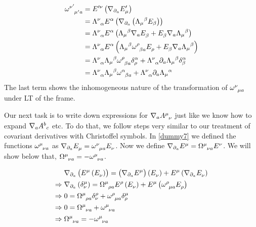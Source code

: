 \begin{align*}
    \tt{\omega}{\nu'}{\mu' a} &= \tt{E'}{ \nu}{} \lera{ \cov{ \tt{E'}{}{ \mu}}{ \partial_a}} \\
    &= \tt{ \Lambda}{ \nu}{ \alpha} \tt{E}{ \alpha}{} \lera{ \cov{ \lera{ \Lambda_ \mu{}^ \beta E_ \beta}}{ \partial_a}} \\
    &= \tt{ \Lambda}{ \nu}{ \alpha} \tt{E}{ \alpha}{} \lera{ \Lambda_ \mu{^ \beta } \cov{\tt{E}{}{\beta}}{a}+ \tt{E}{}{\beta} \cov{\du{\Lambda}{\mu}{\beta}}{a}}\\
     &= \tt{ \Lambda}{ \nu}{ \alpha} \tt{E}{ \alpha}{} \lera{ \Lambda_ \mu{^ \beta } \tt{\omega}{\rho}{\beta a} \tt{E}{}{\rho}+ \tt{E}{}{\beta} \cov{\du{\Lambda}{\mu}{\beta}}{a}}\\
     &= \tt{\Lambda}{ \nu}{\alpha} \du{\Lambda}{\mu}{\beta} \tt{\omega}{\rho}{\beta a} \kron{\alpha}{\rho}+ \tt{\Lambda}{\nu}{\alpha} \partial_a \du{\Lambda}{\mu}{\beta} \kron{\alpha}{\beta}\\
     &= \tt{\Lambda}{ \nu}{\alpha} \du{\Lambda}{\mu}{\beta} \tt{\omega}{\alpha}{\beta a}+ \tt{\Lambda}{\nu}{\alpha} \partial_a \du{\Lambda}{\mu}{\alpha} \\
\end{align*}
The last term shows the inhomogeneous nature of the transformation of $ \tt{\omega}{\nu}{\mu a}$ under LT of the frame.

Our next task is to write down expressions for $ \cov{\tt{A}{\mu}{\nu}}{a}$ just like we know how to expand $ \cov{ A^b{}_c}{a}$ etc. To do that, we follow steps very similar to our treatment of covariant derivatives with Christoffel symbols. In \cref{dummy7} we defined the functions $ \tt{ \omega}{ \mu}{ \nu a}$ as $ \cov{ \tt{E}{}{ \mu}}{ \partial_a} = \tt{ \omega}{ \nu}{ \mu a} \tt{E}{}{ \nu}$. Now we define $ \cov{ \tt{E}{\mu}{}}{ \partial_a} = \tt{ \Omega}{ \mu}{ \nu a} \tt{E}{\nu}{}$. We will show below that, $ \tt{ \Omega}{ \mu}{ \nu a} =- \tt{ \omega}{ \mu}{ \nu a}$. 


\begin{align*}
	& \nabla_{\partial_a}\lera{\tt{E}{\mu}{}\lera{\tt{E}{}{\nu}}} = \lera{\cov{\tt{E}{\mu}{}}{\partial_a}}\lera{\tt{E}{}{\nu}} + \tt{E}{\mu}{}\lera{\cov{\tt{E}{}{\nu}}{\partial_a}} \\
	\Rightarrow\; & \nabla_{\partial_a}  \lera{ \kron{ \mu}{ \nu}}= \tt{\Omega}{\mu}{\rho a} \tt{E}{\rho}{}\lera{\tt{E}{}{\nu}} + \tt{E}{\mu}{}\lera{\tt{\omega}{\rho}{\mu a} \tt{E}{}{\rho}} \\
	\Rightarrow\; & 0 = \tt{\Omega}{\mu}{\rho a} \kron{\rho}{\nu} + \tt{\omega}{\rho}{\mu a} \kron{\mu}{\rho} \\
	\Rightarrow\; & 0 = \tt{\Omega}{\mu}{\nu a}  + \tt{\omega}{\mu}{\nu a} \\
	\Rightarrow\; & \tt{\Omega}{\mu}{\nu a} = - \tt{\omega}{\mu}{\nu a}
\end{align*}

